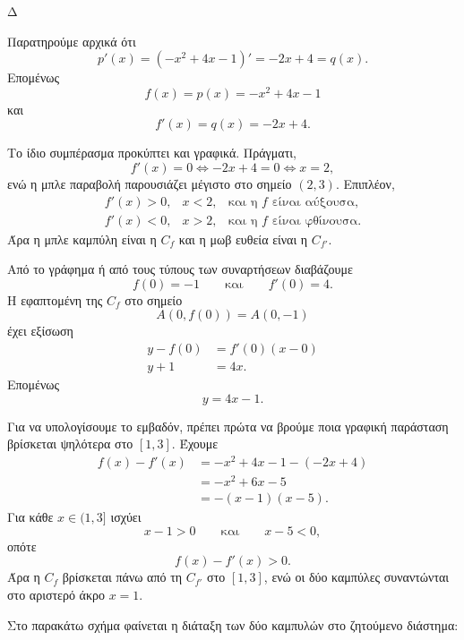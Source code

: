 \begin{thema}{Δ}
\begin{erwthma}
\item Παρατηρούμε αρχικά ότι
\[
p'(x)=\left(-x^2+4x-1\right)'=-2x+4=q(x).
\]
Επομένως
\[
{f(x)=p(x)=-x^2+4x-1}
\]
και
\[
{f'(x)=q(x)=-2x+4}.
\]

Το ίδιο συμπέρασμα προκύπτει και γραφικά. Πράγματι,
\[
f'(x)=0\Leftrightarrow -2x+4=0\Leftrightarrow x=2,
\]
ενώ η μπλε παραβολή παρουσιάζει μέγιστο στο σημείο $(2,3)$. Επιπλέον,
\[
\begin{array}{lll}
f'(x)>0, & x<2, & \text{και η }f\text{ είναι αύξουσα},\\
f'(x)<0, & x>2, & \text{και η }f\text{ είναι φθίνουσα}.
\end{array}
\]
Άρα η μπλε καμπύλη είναι η $C_f$ και η μωβ ευθεία είναι η $C_{f'}$.

\item Από το γράφημα ή από τους τύπους των συναρτήσεων διαβάζουμε
\[
f(0)=-1
\qquad\text{και}\qquad
f'(0)=4.
\]
Η εφαπτομένη της $C_f$ στο σημείο
\[
A(0,f(0))=A(0,-1)
\]
έχει εξίσωση
\begin{align*}
y-f(0)&=f'(0)(x-0)\\
y+1&=4x.
\end{align*}
Επομένως
\[
{y=4x-1}.
\]

\item Για να υπολογίσουμε το εμβαδόν, πρέπει πρώτα να βρούμε ποια
γραφική παράσταση βρίσκεται ψηλότερα στο $[1,3]$. Έχουμε
\begin{align*}
f(x)-f'(x)
&=-x^2+4x-1-(-2x+4)\\
&=-x^2+6x-5\\
&=-(x-1)(x-5).
\end{align*}
Για κάθε $x\in(1,3]$ ισχύει
\[
x-1>0
\qquad\text{και}\qquad
x-5<0,
\]
οπότε
\[
f(x)-f'(x)>0.
\]
Άρα η $C_f$ βρίσκεται πάνω από τη $C_{f'}$ στο $[1,3]$, ενώ οι δύο
καμπύλες συναντώνται στο αριστερό άκρο $x=1$.

Στο παρακάτω σχήμα φαίνεται η διάταξη των δύο καμπυλών στο ζητούμενο
διάστημα:
\begin{center}
\end{center}
\end{erwthma}
\end{thema}
